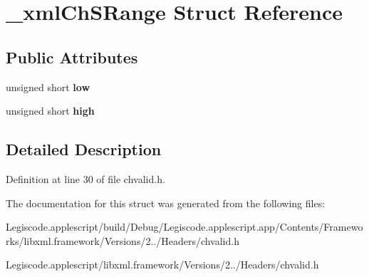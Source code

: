 \hypertarget{struct__xml_ch_s_range}{\section{\-\_\-xml\-Ch\-S\-Range Struct Reference}
\label{struct__xml_ch_s_range}
}
\subsection*{Public Attributes}
\begin{DoxyCompactItemize}
\item 
\hypertarget{struct__xml_ch_s_range_ae6678d601f260427bcad0fd8474df97d}{unsigned short {\bfseries low}}\label{struct__xml_ch_s_range_ae6678d601f260427bcad0fd8474df97d}

\item 
\hypertarget{struct__xml_ch_s_range_a050bc6f71d4bfcf455db4789ec725f1d}{unsigned short {\bfseries high}}\label{struct__xml_ch_s_range_a050bc6f71d4bfcf455db4789ec725f1d}

\end{DoxyCompactItemize}


\subsection{Detailed Description}


Definition at line 30 of file chvalid.\-h.



The documentation for this struct was generated from the following files\-:\begin{DoxyCompactItemize}
\item 
Legiscode.\-applescript/build/\-Debug/\-Legiscode.\-applescript.\-app/\-Contents/\-Frameworks/libxml.\-framework/\-Versions/2../\-Headers/chvalid.\-h\item 
Legiscode.\-applescript/libxml.\-framework/\-Versions/2../\-Headers/chvalid.\-h\end{DoxyCompactItemize}
